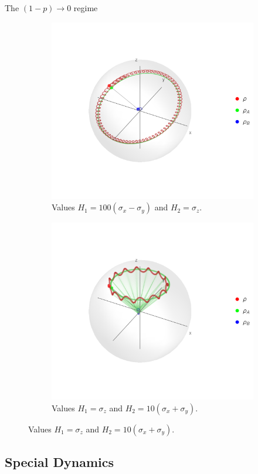 \documentclass{cubeamer}
\begin{document}
\begin{frame}{The $(1-p)\rightarrow 0$ regime}
    \begin{figure}[h!]
        \centering
        \begin{subfigure}{0.5\textwidth}
            \centering
            \includegraphics[width=0.6\linewidth]{../notes/log/maxent/figures/U1xU2_H1=100(sx-sy)_H2=sz_z=0.9_p=0.85_sequence.png}
            \caption{Values $H_{1}=100(\sigma_{x}-\sigma_{y})$ and $H_{2}=\sigma_{z}$.}
        \end{subfigure}%
        \begin{subfigure}{0.5\textwidth}
            \centering
            \includegraphics[width=0.6\linewidth]{../notes/log/maxent/figures/U1xU2_H1=sz_H2=10*(sx+sy)_z=0.9_p=0.85_sequence.png}
            \caption{Values $H_{1}=\sigma_{z}$ and $H_{2}=10(\sigma_{x}+\sigma_{y})$.}
        \end{subfigure}
    \end{figure}
\end{frame}


\subsection{Special Dynamics}
\end{document}
